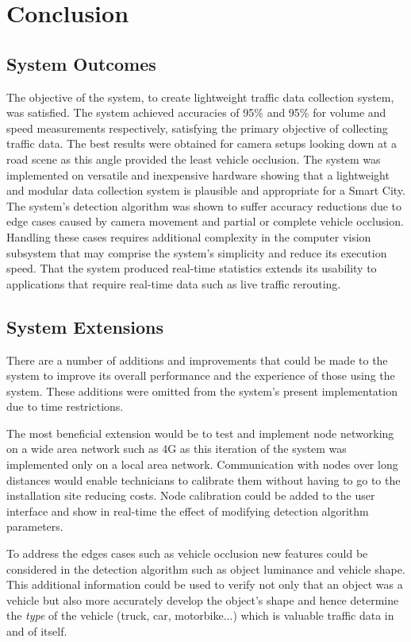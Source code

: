 \chapter{Conclusion}

\section{System Outcomes}

The objective of the system, to create lightweight traffic data collection system, was satisfied. The system achieved accuracies of 95\% and 95\% for volume and speed measurements respectively, satisfying the primary objective of collecting traffic data. The best results were obtained for camera setups looking down at a road scene as this angle provided the least vehicle occlusion. The system was implemented on versatile and inexpensive hardware showing that a lightweight and modular data collection system is plausible and appropriate for a Smart City. The system's detection algorithm was shown to suffer accuracy reductions due to edge cases caused by camera movement and partial or complete vehicle occlusion. Handling these cases requires additional complexity in the computer vision subsystem that may comprise the system's simplicity and reduce its execution speed. That the system produced real-time statistics extends its usability to applications that require real-time data such as live traffic rerouting. 

\section{System Extensions}

There are a number of additions and improvements that could be made to the system to improve its overall performance and the experience of those using the system. These additions were omitted from the system's present implementation due to time restrictions. 

The most beneficial extension would be to test and implement node networking on a wide area network such as 4G as this iteration of the system was implemented only on a local area network. Communication with nodes over long distances would enable technicians to calibrate them without having to go to the installation site reducing costs. Node calibration could be added to the user interface and show in real-time the effect of modifying detection algorithm parameters. 

To address the edges cases such as vehicle occlusion new features could be considered in the detection algorithm such as object luminance and vehicle shape. This additional information could be used to verify not only that an object was a vehicle but also more accurately develop the object's shape and hence determine the \emph{type} of the vehicle (truck, car, motorbike...) which is valuable traffic data in and of itself. 


